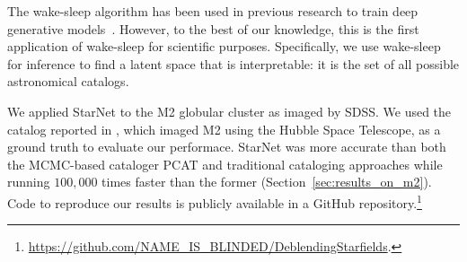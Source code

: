 The wake-sleep algorithm has been used in previous research to train deep generative models~\citep{Hinton1995wake_sleep, bornschein2014reweighted, le2020revisiting}.
However, to the best of our knowledge, this is the first application of wake-sleep for scientific purposes. 
Specifically, we use wake-sleep for inference to find a latent space that is interpretable: it is the set of all possible astronomical catalogs.


We applied StarNet to the M2 globular cluster as imaged by SDSS.
We used the catalog reported in \cite{Sarajedini_2007}, which imaged M2 using the Hubble Space Telescope, as a ground truth to evaluate our performace. 
StarNet was more accurate than both the MCMC-based cataloger PCAT and traditional cataloging approaches while running $100,000$ times faster than the former (Section~\ref{sec:results_on_m2}).
Code to reproduce our results is publicly available in a GitHub repository.\footnote{
\url{https://github.com/NAME_IS_BLINDED/DeblendingStarfields}. 
} 



















